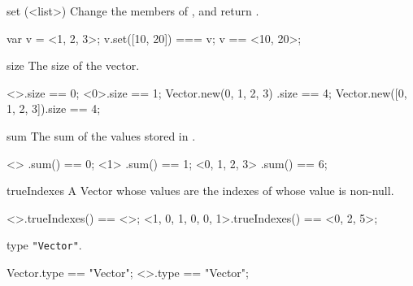 \begin{urbiscriptapi}
\item[set](<list>)%
  Change the members of \this, and return \this.
\begin{urbiassert}
var v = <1, 2, 3>;
v.set([10, 20]) === v;
v == <10, 20>;
\end{urbiassert}


\item[size]%
  The size of the vector.
\begin{urbiassert}
                      <>.size == 0;
                     <0>.size == 1;
Vector.new(0, 1, 2, 3)  .size == 4;
Vector.new([0, 1, 2, 3]).size == 4;
\end{urbiassert}


\item[sum]%
  The sum of the values stored in \this.
\begin{urbiassert}
<>            .sum() == 0;
<1>           .sum() == 1;
<0, 1, 2, 3>  .sum() == 6;
\end{urbiassert}


\item[trueIndexes]%
  A Vector whose values are the indexes of \this whose value is non-null.
\begin{urbiassert}
<>.trueIndexes() == <>;
<1, 0, 1, 0, 0, 1>.trueIndexes() == <0, 2, 5>;
\end{urbiassert}


\item[type]%
  \lstinline|"Vector"|.
\begin{urbiassert}
Vector.type == "Vector";
<>.type == "Vector";
\end{urbiassert}
\end{urbiscriptapi}

